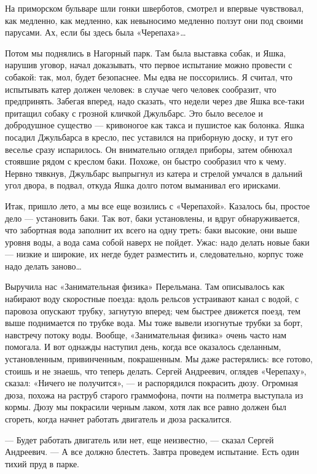 На приморском бульваре шли гонки шверботов, смотрел и впервые  чувствовал,
как медленно, как медленно, как невыносимо медленно ползут они под  своими
парусами. Ах, если бы здесь была «Черепаха»…

Потом мы  поднялись в  Нагорный парк.  Там была  выставка собак,  и  Яшка,
нарушив уговор, начал  доказывать, что первое  испытание можно провести  с
собакой: так, мол, будет безопаснее. Мы едва не поссорились. Я считал, что
испытывать катер  должен человек:  в случае  чего человек  сообразит,  что
предпринять. Забегая  вперед,  надо сказать,  что  недели через  две  Яшка
все-таки притащил собаку с грозной  кличкой Джульбарс. Это было веселое  и
добродушное существо — кривоногое как  такса и пушистое как болонка.  Яшка
посадил Джульбарса в кресло, пес уставился  на приборную доску, и тут  его
веселье сразу испарилось.  Он внимательно оглядел  приборы, затем  обнюхал
стоявшие рядом с  креслом баки. Похоже,  он быстро сообразил  что к  чему.
Нервно тявкнув, Джульбарс выпрыгнул из катера и стрелой умчался в  дальний
угол двора, в подвал, откуда Яшка долго потом выманивал его ирисками.

Итак, пришло  лето, а  мы все  еще возились  с «Черепахой».  Казалось  бы,
простое дело  —  установить  баки.  Так вот,  баки  установлены,  и  вдруг
обнаруживается, что забортная вода заполнит  их всего на одну треть:  баки
высокие, они выше уровня воды, а  вода сама собой наверх не пойдет.  Ужас:
надо делать новые баки  — низкие и широкие,  их негде будет разместить  и,
следовательно, корпус тоже надо делать заново…

Выручила  нас  «Занимательная  физика»  Перельмана.  Там  описывалось  как
набирают воду скоростные поезда: вдоль рельсов устраивают канал с водой, с
паровоза опускают трубку, загнутую вперед; чем быстрее движется поезд, тем
выше поднимается по трубке вода. Мы тоже вывели изогнутые трубки за  борт,
навстречу потоку  воды. Вообще,  «Занимательная  физика» очень  часто  нам
помогала. И  вот однажды  наступил день,  когда все  оказалось  сделанным,
установленным, привинченным, покрашенным. Мы даже растерялись: все готово,
стоишь  и  не  знаешь,  что  теперь  делать.  Сергей  Андреевич,   оглядев
«Черепаху», сказал:  «Ничего не  получится»,  — и  распорядился  покрасить
дюзу. Огромная  дюза,  похожа  на раструб  старого  граммофона,  почти  на
полметра выступала из кормы. Дюзу мы покрасили черным лаком, хотя лак  все
равно  должен  был  сгореть,  когда  начнет  работать  двигатель  и   дюза
раскалится.

— Будет  работать  двигатель или  нет,  еще неизвестно,  —  сказал  Сергей
Андреевич. — А все должно  блестеть. Завтра проведем испытание. Есть  один
тихий пруд в парке.

